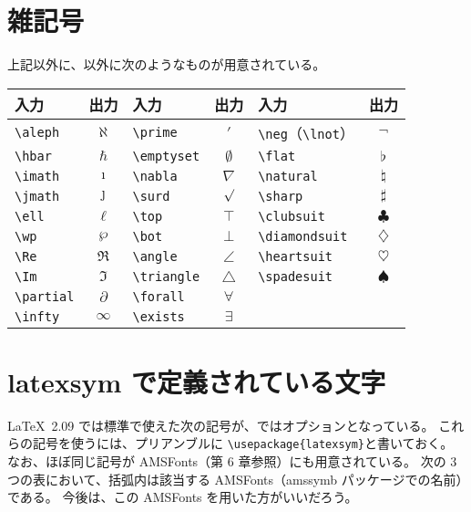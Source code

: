 \section{雑記号}
上記以外に、以外に次のようなものが用意されている。
\begin{longtable}{@{}lclclc@{}}
  入力            & 出力       & 入力             & 出力        & 入力                        & 出力           \\ \toprule
  \verb`\aleph`   & $\aleph$   & \verb`\prime`    & $\prime$    & \verb`\neg`（\verb`\lnot`） & $\neg$         \\
  \verb`\hbar`    & $\hbar$    & \verb`\emptyset` & $\emptyset$ & \verb`\flat`                & $\flat$        \\
  \verb`\imath`   & $\imath$   & \verb`\nabla`    & $\nabla$    & \verb`\natural`             & $\natural$     \\
  \verb`\jmath`   & $\jmath$   & \verb`\surd`     & $\surd$     & \verb`\sharp`               & $\sharp$       \\
  \verb`\ell`     & $\ell$     & \verb`\top`      & $\top$      & \verb`\clubsuit`            & $\clubsuit$    \\
  \verb`\wp`      & $\wp$      & \verb`\bot`      & $\bot$      & \verb`\diamondsuit`         & $\diamondsuit$ \\
  \verb`\Re`      & $\Re$      & \verb`\angle`    & $\angle$    & \verb`\heartsuit`           & $\heartsuit$   \\
  \verb`\Im`      & $\Im$      & \verb`\triangle` & $\triangle$ & \verb`\spadesuit`           & $\spadesuit$   \\
  \verb`\partial` & $\partial$ & \verb`\forall`   & $\forall$   &                             &                \\
  \verb`\infty`   & $\infty$   & \verb`\exists`   & $\exists$   &                             &                \\
\end{longtable}
\section{latexsym で定義されている文字}
\LaTeX\ 2.09 では標準で使えた次の記号が、\LaTeXe{}ではオプションとなっている。
これらの記号を使うには、プリアンブルに \verb`\usepackage{latexsym}`と書いておく。
なお、ほぼ同じ記号が AMSFonts（第 6 章参照）にも用意されている。
次の 3 つの表において、括弧内は該当する AMSFonts（amssymb パッケージでの名前）である。
今後は、この AMSFonts を用いた方がいいだろう。\\

